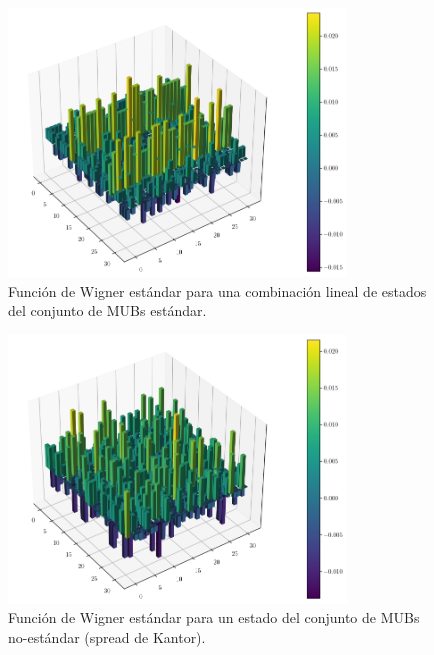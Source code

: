 \documentclass[a4paper]{report}
\begin{document}
  \begin{figure}[ht]
    \centering
    \includegraphics[width=0.8\textwidth]{imgs/wigner-standard-2-5-s2.png}
    \caption{Función de Wigner estándar para una combinación
    lineal de estados del conjunto de MUBs estándar.}
    \label{fig:wigner-standard-2-5-s2}
  \end{figure}

  \begin{figure}[ht]
    \centering
    \includegraphics[width=0.8\textwidth]{imgs/wigner-standard-2-5-s3.png}
    \caption{Función de Wigner estándar para un estado del
    conjunto de MUBs no-estándar (spread de Kantor).}
    \label{fig:wigner-standard-2-5-s3}
  \end{figure}
\end{document}
